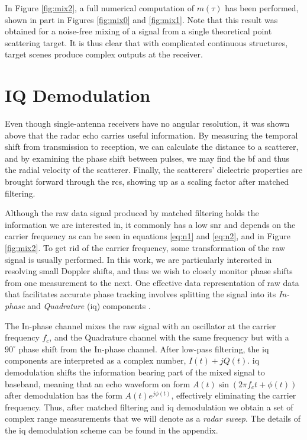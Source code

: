 In Figure \ref{fig:mix2}, a full numerical computation of $m(\tau)$ has been performed, shown in part in Figures \ref{fig:mix0} and \ref{fig:mix1}. Note that this result was obtained for a noise-free mixing of a signal from a single theoretical point scattering target. It is thus clear that with complicated continuous structures, target scenes produce complex outputs at the receiver.

\section{IQ Demodulation}
\label{sec:iq}

Even though single-antenna receivers have no angular resolution, it was shown above that the radar echo carries useful information. By measuring the temporal shift from transmission to reception, we can calculate the distance to a scatterer, and by examining the phase shift between pulses, we may find the \gls{bf} and thus the radial velocity of the scatterer. Finally, the scatterers' dielectric properties are brought forward through the \gls{rcs}, showing up as a scaling factor after matched filtering. 

Although the raw data signal produced by matched filtering holds the information we are interested in, it commonly has a low \gls{snr} \citep{richards_2014} and depends on the carrier frequency as can be seen in equations \eqref{eq:n1} and \eqref{eq:n2}, and in Figure \ref{fig:mix2}. To get rid of the carrier frequency, some transformation of the raw signal is usually performed. In this work, we are particularly interested in resolving small Doppler shifts, and thus we wish to closely monitor phase shifts from one measurement to the next. One effective data representation of raw data that facilitates accurate phase tracking involves splitting the signal into its \emph{In-phase} and \emph{Quadrature} (\gls{iq}) components \citep{lien_gillian_karagozler_amihood_schwesig_olson_raja_poupyrev_2016}. 

The In-phase channel mixes the raw signal with an oscillator at the carrier frequency $f_c$, and the Quadrature channel with the same frequency but with a $90^\circ$ phase shift from the In-phase channel. After low-pass filtering, the \gls{iq} components are interpreted as a complex number, $I(t) + jQ(t)$. \gls{iq} demodulation shifts the information bearing part of the mixed signal to baseband, meaning that an echo waveform on form $A(t)\sin(2\pi f_c t + \phi(t))$ after demodulation has the form $A(t)e^{j\phi(t)}$, effectively eliminating the carrier frequency. Thus, after matched filtering and \gls{iq} demodulation we obtain a set of complex range measurements that we will denote as a \emph{radar sweep}. The details of the \gls{iq} demodulation scheme can be found in the appendix. 

